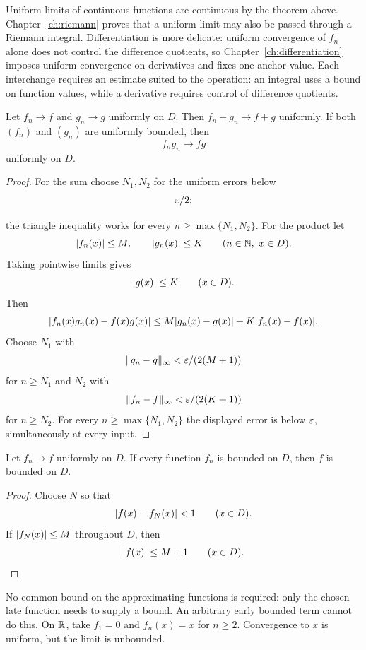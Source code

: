 \begin{remark}
Uniform limits of continuous functions are continuous by the theorem above.
Chapter~\ref{ch:riemann} proves that a uniform limit may also be passed
through a Riemann integral.  Differentiation is more delicate: uniform
convergence of $f_n$ alone does not control the difference quotients, so
Chapter~\ref{ch:differentiation} imposes uniform convergence on derivatives
and fixes one anchor value. Each interchange requires an estimate suited
to the operation: an integral uses a bound on function values, while a
derivative requires control of difference quotients.
\end{remark}

\begin{proposition}
\label{prop:uniform-algebra}
Let $f_n\to f$ and $g_n\to g$ uniformly on $D$. Then $f_n+g_n\to f+g$ uniformly. If both $(f_n)$ and $(g_n)$ are uniformly bounded, then
\[
f_ng_n\to fg
\]
uniformly on $D$.
\end{proposition}
\begin{proof}
For the sum choose $N_1,N_2$ for the uniform errors below
\[
\varepsilon/2;
\]

the triangle inequality works for every $n\geq\max\{N_1,N_2\}$.
For the product let
\[
\lvert f_n(x)\rvert\leq M,
\qquad
\lvert g_n(x)\rvert\leq K
\qquad(n\in\mathbb{N},\ x\in D).
\]
Taking pointwise limits gives
\[
\lvert g(x)\rvert\leq K
\qquad(x\in D).
\]
Then
\[
\lvert f_n(x)g_n(x)-f(x)g(x)\rvert\leq M\lvert g_n(x)-g(x)\rvert+K\lvert f_n(x)-f(x)\rvert.
\]
Choose $N_1$ with
\[
\|g_n-g\|_\infty<\varepsilon/(2(M+1))
\]
 for $n\geq N_1$
and $N_2$ with
\[
\|f_n-f\|_\infty<\varepsilon/(2(K+1))
\]
 for $n\geq N_2$.
For every $n\geq\max\{N_1,N_2\}$ the displayed error is below
$\varepsilon$, simultaneously at every input.
\end{proof}

\begin{proposition}
\label{prop:uniform-boundedness}
Let $f_n\to f$ uniformly on $D$. If every function $f_n$ is bounded on $D$, then $f$ is bounded on $D$.
\end{proposition}
\begin{proof}
Choose $N$ so that
\[
\lvert f(x)-f_N(x)\rvert<1
\qquad(x\in D).
\]
If $\lvert f_N(x)\rvert\leq M$ throughout $D$, then
\[
\lvert f(x)\rvert\leq M+1
\qquad(x\in D).
\]
\end{proof}

No common bound on the approximating functions is required: only the
chosen late function needs to supply a bound. An arbitrary early bounded
term cannot do this. On $\mathbb{R}$, take $f_1=0$ and $f_n(x)=x$ for $n\geq2$.
Convergence to $x$ is uniform, but the limit is unbounded.

